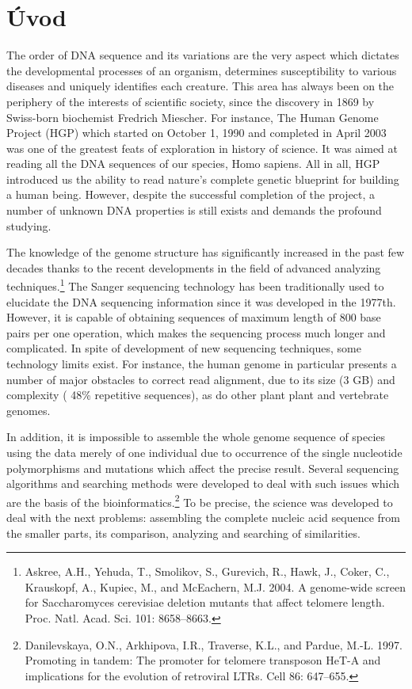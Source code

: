 
{}

\chapter*{Úvod}

\par The order of DNA sequence and its variations are the very aspect which dictates the developmental processes of an organism, determines susceptibility to various diseases and uniquely identifies each creature. This area has always been on the periphery of the interests of scientific society, since the discovery in 1869 by Swiss-born biochemist Fredrich Miescher. For instance, The Human Genome Project (HGP) which started on October 1, 1990 and completed in April 2003 was one of the greatest feats of exploration in history of science. It was aimed at reading all the DNA sequences of our species, Homo sapiens. All in all, HGP introduced us the ability to read nature's complete genetic blueprint for building a human being. However, despite the successful completion of the project, a number of unknown DNA properties is still exists and demands the profound studying.

The knowledge of the genome structure has significantly increased in the past few decades thanks to the recent developments in the field of advanced analyzing techniques.\footnote{Askree, A.H., Yehuda, T., Smolikov, S., Gurevich, R., Hawk, J., Coker, C.,
Krauskopf, A., Kupiec, M., and McEachern, M.J. 2004. A genome-wide screen for Saccharomyces cerevisiae deletion mutants that affect telomere length. Proc. Natl. Acad. Sci. 101: 8658–8663.} The Sanger sequencing technology has been traditionally used to elucidate the DNA sequencing information since it was developed in the 1977th. However, it is capable of obtaining sequences of maximum length of 800 base pairs per one operation, which makes the sequencing process much longer and complicated. In spite of development of new sequencing techniques, some technology limits exist. For instance, the human genome in particular presents a number of major obstacles to correct read alignment, due to its size (3 GB) and complexity ( 48\% repetitive sequences), as do other plant plant and vertebrate genomes.

In addition, it is impossible to assemble the whole genome sequence of species using the data merely of one individual due to occurrence of the single nucleotide polymorphisms and mutations which affect the precise result. Several sequencing algorithms and searching methods were developed to deal with such issues which are the basis of the bioinformatics.\footnote{Danilevskaya, O.N., Arkhipova, I.R., Traverse, K.L., and Pardue, M.-L.
1997. Promoting in tandem: The promoter for telomere transposon HeT-A and implications for the evolution of retroviral LTRs. Cell 86: 647–655.} To be precise, the science was developed to deal with the next problems: assembling the complete nucleic acid sequence from the smaller parts, its comparison, analyzing and searching of similarities.


